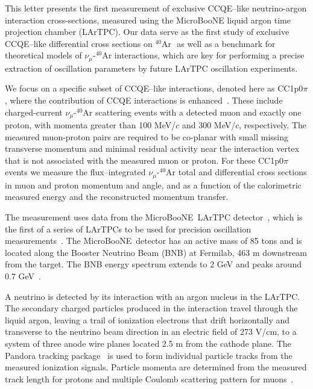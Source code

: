 \documentclass[aps,prl,showpacs,twocolumn,superscriptaddress,letterpaper,longbibliography]{revtex4-1}
\newcommand{\neumu}{$\nu_{\mu}$}
\newcommand{\uB}{MicroBooNE}
\newcommand{\Pmu}{$p_{\mu}$}
\newcommand{\Pp}{$p_{p}$}
\newcommand{\argon}{$^{40}$Ar\,\,}
\begin{document}
This letter presents the first measurement of exclusive CCQE--like neutrino-argon interaction cross-sections,
measured using the MicroBooNE liquid argon time projection chamber (LArTPC).
Our data serve as the first study of exclusive CCQE--like differential cross sections on \argon 
as well as a benchmark for theoretical models of $\nu_{\mu}$-\argon interactions, which are  
key for performing a precise extraction of oscillation parameters by future LArTPC oscillation experiments.

We focus on a specific subset of CCQE--like interactions, denoted here as CC1p0$\pi$, where the contribution of CCQE interactions is enhanced~\cite{Adams:2018lzd}.
These include charged-current \neumu-$^{40}$Ar scattering events with a detected muon and exactly one proton, with momenta greater than 100 MeV/$c$ and 300 MeV/$c$, respectively. 
The measured muon-proton pairs are required to be co-planar with small missing transverse momentum and minimal residual activity near the interaction vertex that is not associated 
with the measured muon or proton.
For these CC1p0$\pi$ events we measure the flux--integrated $\nu_{\mu}$-\argon total and differential cross sections in muon and proton  momentum and angle, and as a function of the calorimetric measured energy and the reconstructed momentum transfer.


The measurement uses data from the \uB\  LArTPC detector~\cite{Acciarri:2016smi}, which is the first of a
series of LArTPCs to be used for precision oscillation measurements~\cite{Antonello:2015lea,Tortorici:2018yns,Abi:2020wmh,Abi:2020evt,Abi:2020oxb,Abi:2020loh}.
%
	The \uB\ detector has an active mass of 85 tons 
	and is located along the Booster Neutrino Beam (BNB) at Fermilab, 463 m downstream from the target.
	The BNB energy spectrum extends to 2 GeV and peaks around 0.7 GeV~\cite{AguilarArevalo:2008yp}.

    A neutrino is detected by its interaction with an argon nucleus in the LArTPC.
	The secondary charged particles produced in the interaction travel through the liquid argon,
	leaving a trail of ionization electrons that drift horizontally  and  transverse  to  the  neutrino beam direction in an electric field of 273 V/cm, to  
	a system of three anode wire planes located 2.5 m from the cathode plane.
	The Pandora tracking package~\cite{Acciarri:2017hat} is used to form individual particle tracks 
	from the measured ionization signals.
	Particle momenta are determined from the measured track length for protons and multiple Coulomb scattering pattern for muons~\cite{Abratenko:2017nki}.
	
\end{document}

